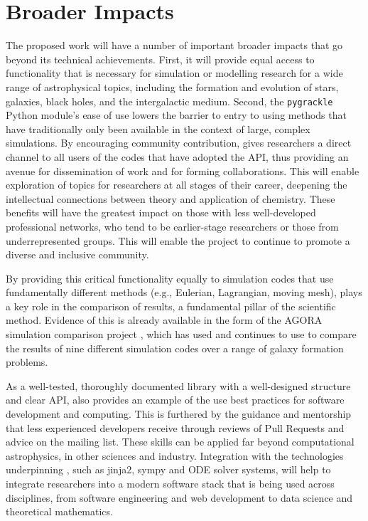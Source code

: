 \section{Broader Impacts}

The proposed work will have a number of important broader impacts that go
beyond its technical achievements.  First, it will provide equal
access to functionality that is necessary for simulation or modelling
research for a wide range of astrophysical topics, including the
formation and evolution of stars, galaxies, black holes, and the
intergalactic medium.
Second, the \texttt{pygrackle} Python module's ease of use lowers the
barrier to entry to using methods that have traditionally only been
available in the context of large, complex simulations.  By
encouraging community contribution, \grackle{} gives researchers
a direct channel to all users of the codes that have adopted the
\grackle{} API, thus providing an avenue for dissemination of
work and for forming collaborations.  This will enable exploration of topics
for researchers at all stages of their career, deepening the intellectual connections between
theory and application of chemistry.  These benefits will have the
greatest impact on those with less well-developed professional
networks, who tend to be earlier-stage researchers or those from
underrepresented groups.  This will enable the \grackle{} project
to continue to promote a diverse and inclusive community.

By providing this critical functionality equally to simulation codes
that use fundamentally different methods (e.g., Eulerian, Lagrangian,
moving mesh), \grackle{} plays a key role in the comparison of
results, a fundamental pillar of the scientific method.  Evidence of
this is already available in the form of the AGORA simulation
comparison project \citep{2014ApJS..210...14K, 2016ApJ...833..202K},
which has used and continues to use \grackle{} to compare the results
of nine
different simulation codes over a range of galaxy formation problems.

As a well-tested, thoroughly documented library with a well-designed
structure and clear API, \grackle{} also provides an example of the
use best practices for software development and computing.  This is
furthered by the guidance and mentorship that less experienced
developers receive through reviews of Pull Requests and
advice on the mailing list.  These skills can be applied far
beyond computational astrophysics, in other sciences and industry.  Integration
with the technologies underpinning \dengo{}, such as jinja2, sympy and ODE
solver systems, will help to integrate researchers into a modern software stack
that is being used across disciplines, from software engineering and web
development to data science and theoretical mathematics.
